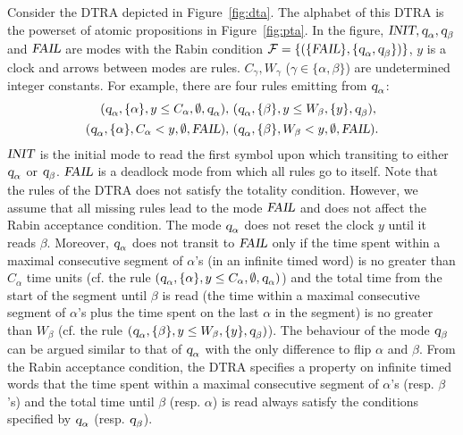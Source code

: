 \begin{example}\label{ex:dta}
Consider the DTRA depicted in Figure~\ref{fig:dta}.
The alphabet of this DTRA is the powerset of atomic propositions in Figure~\ref{fig:pta}.
In the figure, $\mbox{\sl INIT},\mbox{\sl q}_{\alpha},\mbox{\sl q}_{\beta}$ and $\mbox{\sl FAIL}$ are modes with the Rabin condition
$
    \mathcal{F}
    =
    \{
        (\{ \mbox{\sl FAIL} \},
        \{
            \mbox{\sl q}_{\alpha},
            \mbox{\sl q}_{\beta}
        \})
    \}
$, $y$ is a clock and arrows between modes are rules.
$C_\gamma,W_\gamma$ ($\gamma\in\{\alpha,\beta\}$) are undetermined integer constants.
For example, there are four rules emitting from $\mbox{\sl q}_{\alpha}$:
\begin{align*}
(\mbox{\sl q}_{\alpha}, \{ \alpha \}, y \le C_\alpha,\emptyset, \mbox{\sl q}_{\alpha}),& ~(\mbox{\sl q}_{\alpha}, \{ \beta \}, y \le W_\beta, \{ y \}, \mbox{\sl q}_{\beta}),\\
(\mbox{\sl q}_{\alpha}, \{ \alpha \}, C_\alpha<y,\emptyset, \mbox{\sl FAIL}),& ~(\mbox{\sl q}_{\alpha}, \{ \beta \}, W_\beta<y, \emptyset, \mbox{\sl FAIL}).
\end{align*}
$\mbox{\sl INIT}$ is the initial mode to read the first symbol upon which transiting to either $\mbox{\sl q}_{\alpha}$ or $\mbox{\sl q}_{\beta}$.
$\mbox{\sl FAIL}$ is a deadlock mode from which all rules go to itself.
Note that the rules of the DTRA does not satisfy the totality condition.
However, we assume that all missing rules lead to the mode $\mbox{\sl FAIL}$ and does not affect the Rabin acceptance condition.
The mode $\mbox{\sl q}_{\alpha}$ does not reset the clock $y$ until it reads $\beta$.
Moreover, $\mbox{\sl q}_{\alpha}$ does not transit to $\mbox{\sl FAIL}$ only if the time spent within a maximal consecutive segment of $\alpha$'s (in an infinite timed word) is no greater than $C_\alpha$ time units (cf. the rule $(\mbox{\sl q}_{\alpha}, \{ \alpha \}, y \le C_\alpha,\emptyset, \mbox{\sl q}_{\alpha})$) and the total time from the start of the segment until $\beta$ is read (the time within a maximal consecutive segment of $\alpha$'s plus the time spent on the last $\alpha$ in the segment) is no greater than $W_\beta$
(cf. the rule $(\mbox{\sl q}_{\alpha}, \{ \beta \}, y \le W_\beta, \{ y \}, \mbox{\sl q}_{\beta})$).
The behaviour of the mode $\mbox{\sl q}_{\beta}$ can be argued similar to that of $\mbox{\sl q}_{\alpha}$ with the only difference to
flip $\alpha$ and $\beta$.
From the Rabin acceptance condition, the DTRA specifies a property on infinite timed words that the time spent within a maximal consecutive segment of $\alpha$'s (resp. $\beta$'s) and the total time until $\beta$ (resp. $\alpha$) is read
always satisfy the conditions specified by $\mbox{\sl q}_{\alpha}$ (resp. $\mbox{\sl q}_{\beta}$).
\end{example}

